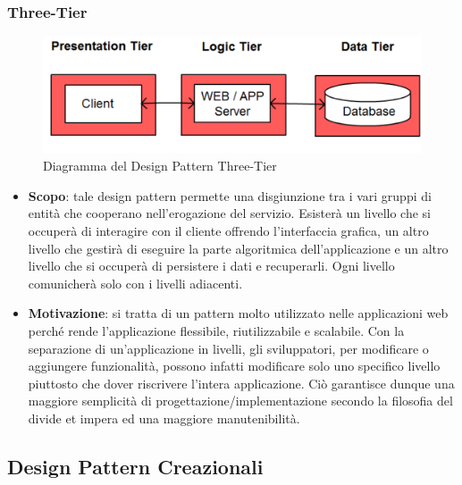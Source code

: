 		\subsubsection{Three-Tier}
		\begin{figure}[H]
		\centering
		\includegraphics[width=0.6\linewidth]{GraficiAppendici/3-tier.png}
		\caption{Diagramma del Design Pattern Three-Tier}
	\end{figure}
		\begin{itemize}
		\item \textbf{Scopo}: tale design pattern permette una disgiunzione tra i vari gruppi di
entità che cooperano nell’erogazione del servizio. Esisterà un livello che si occuperà
di interagire con il cliente offrendo l’interfaccia grafica, un altro livello che gestirà
di eseguire la parte algoritmica dell’applicazione e un altro livello che si occuperà di
persistere i dati e recuperarli. Ogni livello comunicherà solo con i livelli adiacenti.

	\item \textbf{Motivazione}: si tratta di un pattern molto utilizzato nelle applicazioni web perché rende l’applicazione flessibile, riutilizzabile e scalabile. Con la separazione di un’applicazione in livelli, gli sviluppatori, per modificare o aggiungere funzionalità, possono infatti modificare solo uno specifico livello piuttosto che dover riscrivere l’intera applicazione. Ciò garantisce dunque una maggiore semplicità di progettazione/implementazione secondo la filosofia del divide et impera ed una maggiore manutenibilità.
		\end{itemize}
	\subsection{Design Pattern Creazionali}
	

